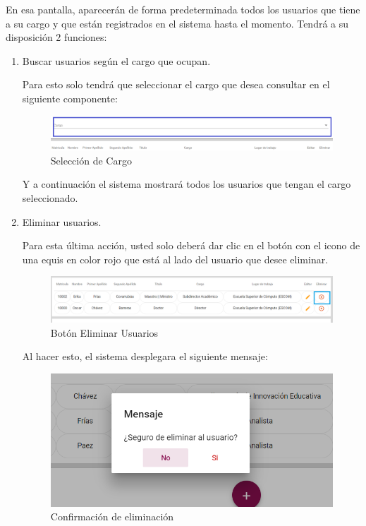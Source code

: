         En esa pantalla, aparecerán de forma predeterminada todos los usuarios que tiene a su cargo y que están registrados en el sistema hasta el momento. Tendrá a su disposición 2 funciones:
        \newpage
        \begin{enumerate}
        
            \item   Buscar usuarios según el cargo que ocupan.
        
                Para esto solo tendrá que seleccionar el cargo que desea consultar en el siguiente componente:
            
                \begin{figure}[!hbtp]
                    \centering
                    \hypertarget{cargo1}{\includegraphics[width=0.7\linewidth]{images/SP5/BtnCargo1}}
                    \caption{Selección de Cargo}
                    \label{cargo1}
                \end{figure}
            
                 Y a continuación el sistema mostrará todos los usuarios que tengan el cargo seleccionado.
                
            
                
            \item Eliminar usuarios.
            
                Para esta última acción, usted solo deberá dar clic en el botón con el icono de una equis en color rojo que está al lado del usuario que desee  eliminar. 
            
                \begin{figure}[!hbtp]
                    \centering
                    \hypertarget{eliminar}{\includegraphics[width=0.7\linewidth]{images/SP5/BtnEliminar}}
                    \caption{Botón Eliminar Usuarios}
                    \label{eliminar}
                \end{figure}
            
                Al hacer esto, el sistema desplegara el siguiente mensaje:
                
               \begin{figure}[!hbtp]
                	\centering
                	\includegraphics[width=0.4\linewidth]{images/SP5/MSG22}
               	\caption{Confirmación de eliminación}
               	\label{confirmarE}
                

\end{figure}
\end{enumerate}
